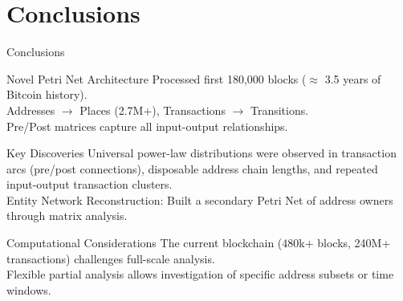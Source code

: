 \documentclass{beamer}
\begin{document}
\section{Conclusions}
\begin{frame}{Conclusions}
    \footnotesize
    \vspace{-0.1cm}

    \begin{block}{Novel Petri Net Architecture}
        Processed first 180,000 blocks ($\approx$ 3.5 years of Bitcoin history).\\[2mm]
        Addresses $\rightarrow$ Places (2.7M+), Transactions $\rightarrow$ Transitions.\\[2mm]
        Pre/Post matrices capture all input-output relationships.
    \end{block}
    \vspace{-0.1cm}

    \begin{block}{Key Discoveries}
        Universal power-law distributions were observed in transaction arcs (pre/post connections), disposable address chain lengths, and repeated input-output transaction clusters.\\[2mm]
        Entity Network Reconstruction: Built a secondary Petri Net of address owners through matrix analysis.
    \end{block}
    \vspace{-0.1cm}

    \begin{block}{Computational Considerations}
        The current blockchain (480k+ blocks, 240M+ transactions) challenges full-scale analysis.\\[2mm]
        Flexible partial analysis allows investigation of specific address subsets or time windows.
    \end{block}
\end{frame}
\end{document}
